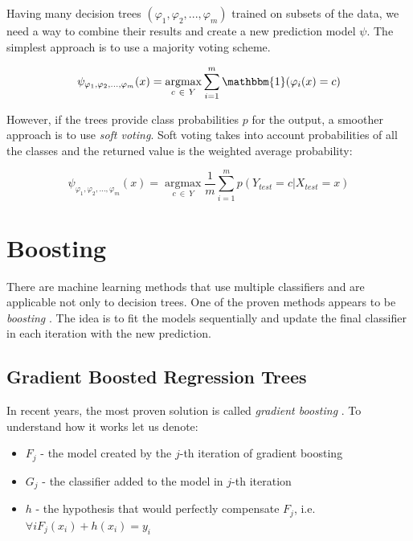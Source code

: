 \documentclass{pracamgr}
\begin{document}
Having many decision trees $(\varphi_{1}, \varphi_{2}, ..., \varphi_{m})$ trained on subsets
of the data, we need a way to combine their results and create a new prediction model
$\psi$. The simplest approach is to use a majority voting scheme. 

\begin{equation}
\psi_{\varphi_{1}, \varphi_{2}, \ldots, \varphi_{m}}(x) = \underset{c\ \in\ Y}{\operatorname{argmax}}\sum_{i=1}^{m}  \mathbbm{1}(\varphi_{i}(x) = c)
\end{equation}

However, if the trees provide class probabilities $p$ for the output, a smoother approach is to
use \textit{soft voting}. Soft voting takes into account probabilities of all the
classes and the returned value is the weighted average probability:

\begin{equation}
\psi_{\varphi_{1}, \varphi_{2}, \ldots, \varphi_{m}}(x) = \underset{c\ \in\ Y}{\operatorname{argmax}}  \frac{1}{m} \sum_{i=1}^{m} p(Y_{test} = c| X_{test} = x)
\end{equation}

\section{Boosting}
There are machine learning methods that use multiple classifiers and are applicable not only
to decision trees. One of the proven methods appears to be \textit{boosting} \citep{freund99ashort}. The 
idea is to fit the models sequentially and update the final classifier in each iteration
with the new prediction.

\subsection{Gradient Boosted Regression Trees}
In recent years, the most proven solution is called \textit{gradient boosting} \citep{friedman2001greedy}. To understand how it works let us denote:

\begin{itemize}
\item $F_{j}$ - the model created by the $j$-th iteration of gradient boosting
\item $G_{j}$ - the classifier added to the model in $j$-th iteration
\item $h$ - the hypothesis that would perfectly compensate $F_{j}$, i.e.
$\forall{i} F_{j}(x_{i}) + h(x_{i}) = y_{i}$ 
\end{itemize}
\end{document}
